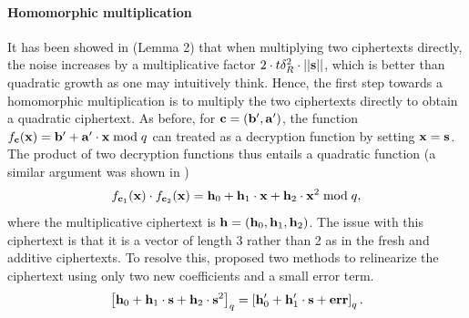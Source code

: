 \documentclass[../main.tex]{subfiles}
\begin{document}
\paragraph{Homomorphic multiplication}
It has been showed in \cite{fan2012somewhat} (Lemma 2) that when multiplying two ciphertexts directly, the noise increases by a multiplicative factor $2 \cdot t \delta_R^2 \cdot ||\mathbf{s}||$, which is better than quadratic growth as one may intuitively think. Hence, the first step towards a homomorphic multiplication is to multiply the two ciphertexts directly to obtain a quadratic ciphertext. 
As before, for $\mathbf{c} = (\mathbf{b'},\mathbf{a'})$, the function $f_{\mathbf{c}}(\mathbf{x})=\mathbf{b}' + \mathbf{a}' \cdot \mathbf{x} \bmod q$ can treated as a decryption function by setting $\mathbf{x}=\mathbf{s}$. The product of two decryption functions thus entails a quadratic function (a similar argument was shown in )
\begin{align*}
    f_{\mathbf{c}_1}(\mathbf{x}) \cdot f_{\mathbf{c}_2}(\mathbf{x}) = \mathbf{h}_0 + \mathbf{h}_1 \cdot \mathbf{x} + \mathbf{h}_2 \cdot \mathbf{x}^2 \bmod q,
\end{align*}
where the multiplicative ciphertext is $\mathbf{h}=(\mathbf{h}_0, \mathbf{h}_1, \mathbf{h}_2)$.
The issue with this ciphertext is that it is a vector of length 3 rather than 2 as in the fresh and additive ciphertexts. To resolve this, \cite{fan2012somewhat} proposed two methods to relinearize the ciphertext using only two new coefficients and a small error term.
\begin{align*}
    \left[{\mathbf{h}_0+\mathbf{h}_1 \cdot \mathbf{s} + \mathbf{h}_2 \cdot \mathbf{s}^2}\right]_q = \left[{\mathbf{h}'_0+\mathbf{h}'_1 \cdot \mathbf{s} + \mathbf{err}}\right]_q.
\end{align*}
\end{document}
